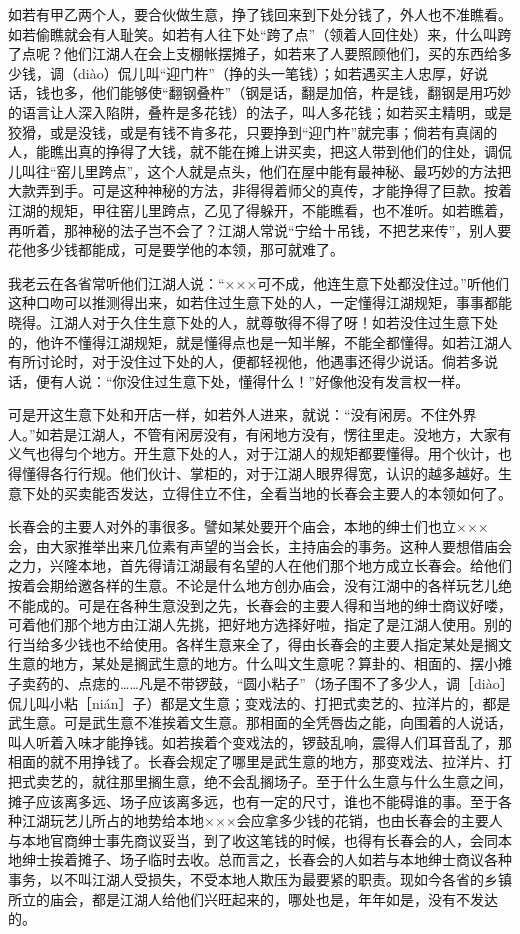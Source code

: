 \documentclass[12pt,UTF8]{ctexbook}
\begin{document}
如若有甲乙两个人，要合伙做生意，挣了钱回来到下处分钱了，外人也不准瞧看。如若偷瞧就会有人耻笑。如若有人往下处“跨了点”（领着人回住处）来，什么叫跨了点呢？他们江湖人在会上支棚帐摆摊子，如若来了人要照顾他们，买的东西给多少钱，调（diào）侃儿叫“迎门杵”（挣的头一笔钱）；如若遇买主人忠厚，好说话，钱也多，他们能够使“翻钢叠杵”（钢是话，翻是加倍，杵是钱，翻钢是用巧妙的语言让人深入陷阱，叠杵是多花钱）的法子，叫人多花钱；如若买主精明，或是狡猾，或是没钱，或是有钱不肯多花，只要挣到“迎门杵”就完事；倘若有真阔的人，能瞧出真的挣得了大钱，就不能在摊上讲买卖，把这人带到他们的住处，调侃儿叫往“窑儿里跨点”，这个人就是点头，他们在屋中能有最神秘、最巧妙的方法把大款弄到手。可是这种神秘的方法，非得得着师父的真传，才能挣得了巨款。按着江湖的规矩，甲往窑儿里跨点，乙见了得躲开，不能瞧看，也不准听。如若瞧着，再听着，那神秘的法子岂不会了？江湖人常说“宁给十吊钱，不把艺来传”，别人要花他多少钱都能成，可是要学他的本领，那可就难了。

我老云在各省常听他们江湖人说：“×××可不成，他连生意下处都没住过。”听他们这种口吻可以推测得出来，如若住过生意下处的人，一定懂得江湖规矩，事事都能晓得。江湖人对于久住生意下处的人，就尊敬得不得了呀！如若没住过生意下处的，他许不懂得江湖规矩，就是懂得点也是一知半解，不能全都懂得。如若江湖人有所讨论时，对于没住过下处的人，便都轻视他，他遇事还得少说话。倘若多说话，便有人说：“你没住过生意下处，懂得什么！”好像他没有发言权一样。

可是开这生意下处和开店一样，如若外人进来，就说：“没有闲房。不住外界人。”如若是江湖人，不管有闲房没有，有闲地方没有，愣往里走。没地方，大家有义气也得匀个地方。开生意下处的人，对于江湖人的规矩都要懂得。用个伙计，也得懂得各行行规。他们伙计、掌柜的，对于江湖人眼界得宽，认识的越多越好。生意下处的买卖能否发达，立得住立不住，全看当地的长春会主要人的本领如何了。

长春会的主要人对外的事很多。譬如某处要开个庙会，本地的绅士们也立×××会，由大家推举出来几位素有声望的当会长，主持庙会的事务。这种人要想借庙会之力，兴隆本地，首先得请江湖最有名望的人在他们那个地方成立长春会。给他们按着会期给邀各样的生意。不论是什么地方创办庙会，没有江湖中的各样玩艺儿绝不能成的。可是在各种生意没到之先，长春会的主要人得和当地的绅士商议好喽，可着他们那个地方由江湖人先挑，把好地方选择好啦，指定了是江湖人使用。别的行当给多少钱也不给使用。各样生意来全了，得由长春会的主要人指定某处是搁文生意的地方，某处是搁武生意的地方。什么叫文生意呢？算卦的、相面的、摆小摊子卖药的、点痣的……凡是不带锣鼓，“圆小粘子”（场子围不了多少人，调［diào］侃儿叫小粘［nián］子）都是文生意；变戏法的、打把式卖艺的、拉洋片的，都是武生意。可是武生意不准挨着文生意。那相面的全凭唇齿之能，向围着的人说话，叫人听着入味才能挣钱。如若挨着个变戏法的，锣鼓乱响，震得人们耳音乱了，那相面的就不用挣钱了。长春会规定了哪里是武生意的地方，那变戏法、拉洋片、打把式卖艺的，就往那里搁生意，绝不会乱搁场子。至于什么生意与什么生意之间，摊子应该离多远、场子应该离多远，也有一定的尺寸，谁也不能碍谁的事。至于各种江湖玩艺儿所占的地势给本地×××会应拿多少钱的花销，也由长春会的主要人与本地官商绅士事先商议妥当，到了收这笔钱的时候，也得有长春会的人，会同本地绅士挨着摊子、场子临时去收。总而言之，长春会的人如若与本地绅士商议各种事务，以不叫江湖人受损失，不受本地人欺压为最要紧的职责。现如今各省的乡镇所立的庙会，都是江湖人给他们兴旺起来的，哪处也是，年年如是，没有不发达的。
\end{document}

